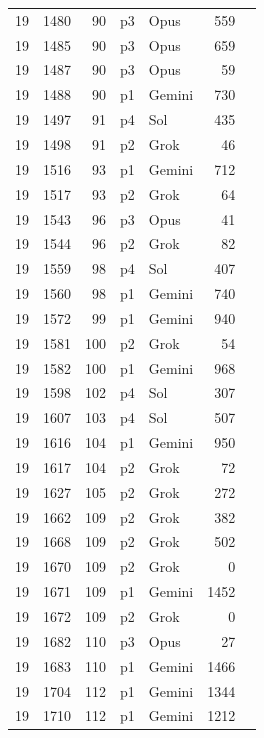 \begin{longtable}{r r r l l r L{2.2in}}
19 & 1480 & 90 & p3 & Opus & 559 &  \\
19 & 1485 & 90 & p3 & Opus & 659 &  \\
19 & 1487 & 90 & p3 & Opus & 59 &  \\
19 & 1488 & 90 & p1 & Gemini & 730 &  \\
19 & 1497 & 91 & p4 & Sol & 435 &  \\
19 & 1498 & 91 & p2 & Grok & 46 &  \\
19 & 1516 & 93 & p1 & Gemini & 712 &  \\
19 & 1517 & 93 & p2 & Grok & 64 &  \\
19 & 1543 & 96 & p3 & Opus & 41 &  \\
19 & 1544 & 96 & p2 & Grok & 82 &  \\
19 & 1559 & 98 & p4 & Sol & 407 &  \\
19 & 1560 & 98 & p1 & Gemini & 740 &  \\
19 & 1572 & 99 & p1 & Gemini & 940 &  \\
19 & 1581 & 100 & p2 & Grok & 54 &  \\
19 & 1582 & 100 & p1 & Gemini & 968 &  \\
19 & 1598 & 102 & p4 & Sol & 307 &  \\
19 & 1607 & 103 & p4 & Sol & 507 &  \\
19 & 1616 & 104 & p1 & Gemini & 950 &  \\
19 & 1617 & 104 & p2 & Grok & 72 &  \\
19 & 1627 & 105 & p2 & Grok & 272 &  \\
19 & 1662 & 109 & p2 & Grok & 382 &  \\
19 & 1668 & 109 & p2 & Grok & 502 &  \\
19 & 1670 & 109 & p2 & Grok & 0 &  \\
19 & 1671 & 109 & p1 & Gemini & 1452 &  \\
19 & 1672 & 109 & p2 & Grok & 0 &  \\
19 & 1682 & 110 & p3 & Opus & 27 &  \\
19 & 1683 & 110 & p1 & Gemini & 1466 &  \\
19 & 1704 & 112 & p1 & Gemini & 1344 &  \\
19 & 1710 & 112 & p1 & Gemini & 1212 &  \\

\end{longtable}
